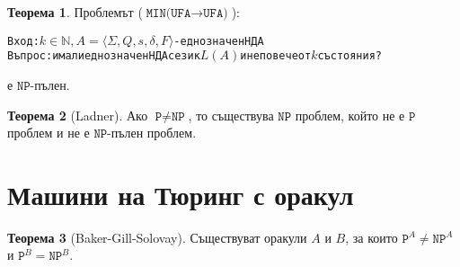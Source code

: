 \documentclass[a4paper]{article}
\theoremstyle{definition}
\newtheorem{theorem}{Теорема}
\begin{document}
\begin{theorem}
Проблемът ($\texttt{MIN(UFA}\rightarrow\texttt{UFA)}$):
\begin{alltt}
Вход: \(k\in\mathbb{N}, A=\langle\Sigma,Q,s,\delta,F\rangle\) - еднозначен НДА
Въпрос: има ли еднозначен НДА с език \(L(A)\) и не повече от \(k\) състояния?
\end{alltt}
е $\texttt{NP}$-пълен.
\end{theorem}

\begin{theorem}[Ladner]
  Ако $\texttt{P} \neq \texttt{NP}$, то съществува $\texttt{NP}$ проблем, който не е $\texttt{P}$ проблем и не е $\texttt{NP}$-пълен проблем.
\end{theorem}

\section{Машини на Тюринг с оракул}

\begin{theorem}[Baker-Gill-Solovay]
  Съществуват оракули $A$ и $B$, за които $\texttt{P}^A \neq \texttt{NP}^A$ и $\texttt{P}^B = \texttt{NP}^B$.
\end{theorem}




\end{document}
